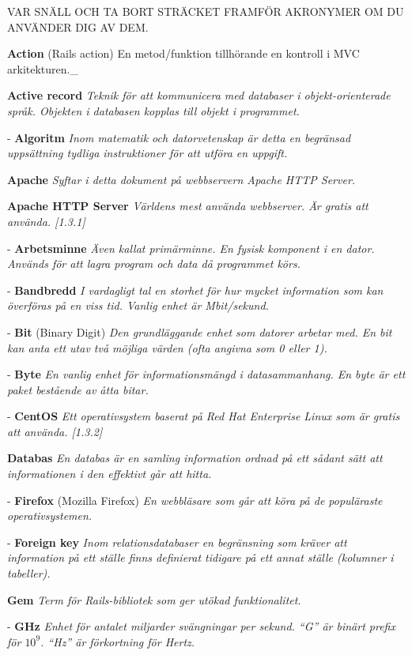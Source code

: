 \documentclass[a4paper, twoside, 11pt, titlepage]{article}
\begin{document}
	VAR SNÄLL OCH TA BORT STRÄCKET FRAMFÖR AKRONYMER OM DU ANVÄNDER DIG AV DEM.

	\textbf{Action} (Rails action) En metod/funktion tillhörande en kontroll i MVC arkitekturen.\_

	\textbf{Active record} \emph{Teknik för att kommunicera med databaser i objekt-orienterade språk. Objekten i databasen kopplas till objekt i programmet.}

	- \textbf{Algoritm} \emph{Inom matematik och datorvetenskap är detta en begränsad uppsättning tydliga instruktioner för att utföra en uppgift.}

	\textbf{Apache} \emph{Syftar i detta dokument på webbservern Apache HTTP Server.}

	\textbf{Apache HTTP Server} \emph{Världens mest använda webbserver. Är gratis att använda. [1.3.1]}

	- \textbf{Arbetsminne} \emph{Även kallat primärminne. En fysisk komponent i en dator. Används för att lagra program och data då programmet körs.}

	- \textbf{Bandbredd} \emph{I vardagligt tal en storhet för hur mycket information som kan överföras på en viss tid. Vanlig enhet är Mbit/sekund.}

	- \textbf{Bit} (Binary Digit) \emph{Den grundläggande enhet som datorer arbetar med. En bit kan anta ett utav två möjliga värden (ofta angivna som 0 eller 1).}

	- \textbf{Byte} \emph{En vanlig enhet för informationsmängd i datasammanhang. En byte är ett paket bestående av åtta bitar.}

	- \textbf{CentOS} \emph{Ett operativsystem baserat på Red Hat Enterprise Linux som är gratis att använda. [1.3.2]}

	\textbf{Databas} \emph{En databas är en samling information ordnad på ett sådant sätt att informationen i den effektivt går att hitta.}

	- \textbf{Firefox} (Mozilla Firefox) \emph{En webbläsare som går att köra på de populäraste operativsystemen.}

	- \textbf{Foreign key} \emph{Inom relationsdatabaser en begränsning som kräver att information på ett ställe finns definierat tidigare på ett annat ställe (kolumner i tabeller).}

	\textbf{Gem} \emph{Term för Rails-bibliotek som ger utökad funktionalitet.}

	- \textbf{GHz} \emph{Enhet för antalet miljarder svängningar per sekund. ``G'' är binärt prefix för $10^{9}$. ``Hz'' är förkortning för Hertz.}
\end{document}
